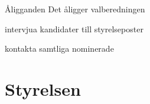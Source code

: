 \documentclass[pdfbookmarks,a4paper,11pt]{article}
\newlength{\itemcollength}
\newenvironment{reglemlista}{%
  \begin{list}{}{%
      \setlength{\labelwidth}{\itemcollength}%
      \setlength{\leftmargin}{\labelwidth + \labelsep}%
      \renewcommand{\makelabel}[1]{%
        \raisebox{0pt}[1ex][0pt]{%
          \makebox[\labelwidth][l]{%
            \parbox[t]{\itemcollength}{%
              \raggedright\hspace{0pt}##1}}}\hfill}%
      }}{%
  \end{list}}
\begin{document}
\begin{reglemlista}

	\item[Åligganden]
	Det åligger valberedningen
	\begin{attlista}
		\item intervjua kandidater till styrelseposter
		\item kontakta samtliga nominerade
	\end{attlista}

\end{reglemlista}

\section{Styrelsen}

\begin{reglemlista}


\end{reglemlista}
\end{document}
